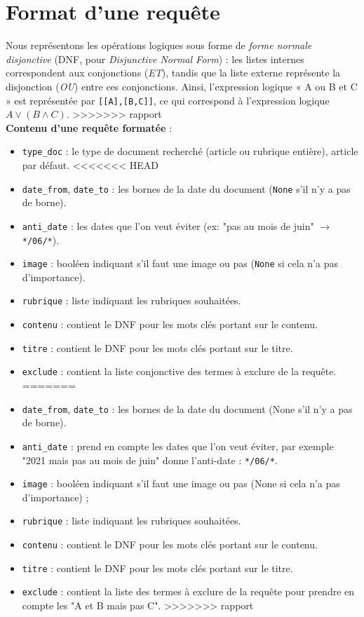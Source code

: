 \section{Format d'une requête}
Nous représentons les opérations logiques sous forme de \textit{forme normale disjonctive} (DNF, pour \textit{Disjunctive Normal Form}) : les listes internes correspondent aux conjonctions (\textit{ET}), tandis que la liste externe représente la disjonction (\textit{OU}) entre ces conjonctions. Ainsi, l'expression logique « A ou B et C » est représentée par \texttt{[[A],[B,C]]}, ce qui correspond à l'expression logique \(A \lor (B \land C)\).
>>>>>>> rapport
\\[1em]
\textbf{Contenu d'une requête formatée} : 
\begin{itemize}
    \item \texttt{type\_doc} : le type de document recherché (article ou rubrique entière), article par défaut.
<<<<<<< HEAD
    \item \texttt{date\_from}, \texttt{date\_to} : les bornes de la date du document (\texttt{None} s'il n'y a pas de borne).
    \item \texttt{anti\_date} : les dates que l'on veut éviter (ex: "pas au mois de juin" $\to$ \texttt{*/06/*}).
    \item \texttt{image} : booléen indiquant s'il faut une image ou pas (\texttt{None} si cela n'a pas d'importance).
    \item \texttt{rubrique} : liste indiquant les rubriques souhaitées. 
    \item \texttt{contenu} : contient le DNF pour les mots clés portant sur le contenu.
    \item \texttt{titre} : contient le DNF pour les mots clés portant sur le titre.
    \item \texttt{exclude} : contient la liste conjonctive des termes à exclure de la requête.
=======
    \item \texttt{date\_from}, \texttt{date\_to} : les bornes de la date du document (None s'il n'y a pas de borne).
    \item \texttt{anti\_date} : prend en compte les dates que l'on veut éviter, par exemple "2021 mais pas au mois de juin" 
            donne l'anti-date : \texttt{*/06/*}.
    \item \texttt{image} : booléen indiquant s'il faut une image ou pas (None si cela n'a pas d'importance) ;
    \item \texttt{rubrique} : liste indiquant les rubriques souhaitées. 
    \item \texttt{contenu} : contient le DNF pour les mots clés portant sur le contenu.
    \item \texttt{titre} : contient le DNF pour les mots clés portant sur le titre.
    \item \texttt{exclude} : contient la liste des termes à exclure de la requête pour prendre en compte les "A et B mais pas C".
>>>>>>> rapport

\end{itemize}


